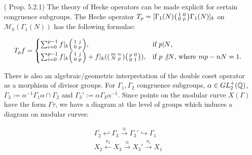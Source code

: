 \begin{example} (\cite{Shurman} Prop. 5.2.1)
The theory of Hecke operators can be made explicit for certain congruence subgroups. The Hecke operator $T_p = [ \Gamma_1(N) \begin{psmallmatrix} 1 & 0 \\ 0 & p \end{psmallmatrix} \Gamma_1(N)]_k $ on $\mathcal{M}_k(\Gamma_1(N))$ has the following formulae:

\[T_p f =
\begin{cases}
\sum_{i = 0}^{p-1} f|_k \begin{psmallmatrix}
    1 & j \\ 0 & p \end{psmallmatrix}, & \text{if $p | N$,} \\
\sum_{i = 0}^{p-1} f|_k \begin{psmallmatrix}
    1 & j \\ 0 & p \end{psmallmatrix} + f|_k (\begin{psmallmatrix} m & n \\ N & p \end{psmallmatrix} \begin{psmallmatrix}
        p & 0 \\ 0 & 1
    \end{psmallmatrix}), & \text{if $p\not | N$, where $mp - nN = 1$.} \\
\end{cases} 
\]
\end{example}



There is also an algebraic/geometric interpretation of the double coset operator as a morphism of divisor groups. For $\Gamma_1, \Gamma_2$ congruence subgroups, $\alpha \in GL_2^+(\mathbb{Q}) $, $\Gamma_3 := \alpha^{-1} \Gamma_1 \alpha \cap \Gamma_2$ and $\Gamma_3' := \alpha \Gamma_3 \alpha^{-1}$. Since points on the modular curve $X(\Gamma)$ have the form $\Gamma \tau$, we have a diagram at the level of groups which induces a diagram on modular curves:


\begin{align*}
\Gamma_2 \hookleftarrow \Gamma_3 \xrightarrow{\cong} \Gamma_3' \hookrightarrow \Gamma_1 \\
X_2 \xleftarrow{\pi_2} X_3 \xrightarrow{\cong} X_3' \xrightarrow{\pi_1} X_1
\end{align*}


